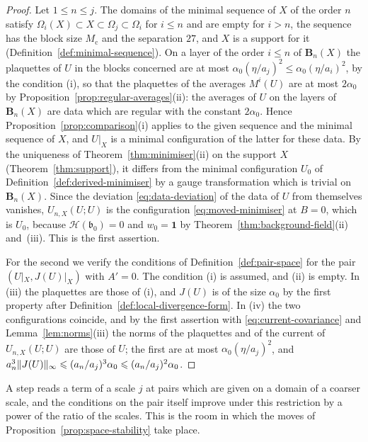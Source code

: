 \documentclass[11pt]{preprint}
\newcommand{\id}{\mathbf 1}
\DeclarePairedDelimiter{\norm}{\lVert}{\rVert}
\numberwithin{equation}{section}
\begin{document}
\begin{proof}
Let $1 \leqslant n \leqslant j$. The domains of the minimal sequence of $X$ of the order $n$ satisfy $\Omega_i(X) \subset X \subset \Omega_j \subset \Omega_i$ for $i \leqslant n$ and are empty for $i > n$, the sequence has the block size $M_{\mathrm c}$ and the separation $27$, and $X$ is a support for it (Definition~\ref{def:minimal-sequence}). On a layer of the order $i \leqslant n$ of $\mathbf B_n(X)$ the plaquettes of $U$ in the blocks concerned are at most $\alpha_0(\eta/a_j)^2 \leqslant \alpha_0(\eta/a_i)^2$, by the condition (i), so that the plaquettes of the averages $M^i(U)$ are at most $2\alpha_0$ by Proposition~\ref{prop:regular-averages}(ii): the averages of $U$ on the layers of $\mathbf B_n(X)$ are data which are regular with the constant $2\alpha_0$. Hence Proposition~\ref{prop:comparison}(i) applies to the given sequence and the minimal sequence of $X$, and $U|_X$ is a minimal configuration of the latter for these data. By the uniqueness of Theorem~\ref{thm:minimiser}(ii) on the support $X$ (Theorem~\ref{thm:support}), it differs from the minimal configuration $U_0$ of Definition~\ref{def:derived-minimiser} by a gauge transformation which is trivial on $\mathbf B_n(X)$. Since the deviation \eqref{eq:data-deviation} of the data of $U$ from themselves vanishes, $U_{n,X}(U; U)$ is the configuration \eqref{eq:moved-minimiser} at $B = 0$, which is $U_0$, because $\mathcal H(\mathfrak b_0) = 0$ and $w_0 = \id$ by Theorem~\ref{thm:background-field}(ii) and~(iii). This is the first assertion.

For the second we verify the conditions of Definition~\ref{def:pair-space} for the pair $(U|_X, J(U)|_X)$ with $A' = 0$. The condition (i) is assumed, and (ii) is empty. In (iii) the plaquettes are those of (i), and $J(U)$ is of the size $\alpha_0$ by the first property after Definition~\ref{def:local-divergence-form}. In (iv) the two configurations coincide, and by the first assertion with \eqref{eq:current-covariance} and Lemma~\ref{lem:norms}(iii) the norms of the plaquettes and of the current of $U_{n,X}(U; U)$ are those of $U$; the first are at most $\alpha_0(\eta/a_j)^2$, and $a_n^3\norm{J(U)}_\infty \leqslant (a_n/a_j)^3\alpha_0 \leqslant (a_n/a_j)^2\alpha_0$.
\end{proof}

A step reads a term of a scale $j$ at pairs which are given on a domain of a coarser scale, and the conditions on the pair itself improve under this restriction by a power of the ratio of the scales. This is the room in which the moves of Proposition~\ref{prop:space-stability} take place.
\end{document}
